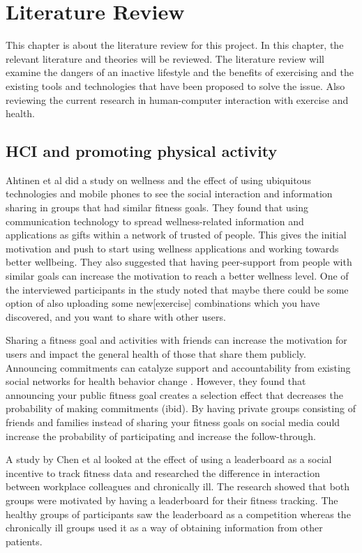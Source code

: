 \chapter{Literature Review}
This chapter is about the literature review for this project. In this chapter, the relevant literature and theories will be reviewed. The literature review will examine the dangers of an inactive lifestyle and the benefits of exercising and the existing tools and technologies that have been proposed to solve the issue. Also reviewing the current research in human-computer interaction with exercise and health.

\section{HCI and promoting physical activity}
Ahtinen et al\cite{Ahtinen2009} did a study on wellness and the effect of using ubiquitous technologies and mobile phones to see the social interaction and information sharing in groups that had similar fitness goals. They found that using communication technology to spread wellness-related information and applications as gifts within a network of trusted of people. This gives the initial motivation and push to start using wellness applications and working towards better wellbeing. They also suggested that having peer-support from people with similar goals can increase the motivation to reach a better wellness level. One of the interviewed participants in the study noted that maybe there could be some option of also uploading some new[exercise] combinations which you have discovered, and you want to share with other users.

Sharing a fitness goal and activities with friends can increase the motivation for users and impact the general health of those that share them publicly. Announcing  commitments can catalyze support and accountability from existing social networks for health behavior change \cite{Munson2015}. However, they found that announcing your public fitness goal creates a selection effect that decreases the probability of making commitments (ibid).  By having private groups consisting of friends and families instead of sharing your fitness goals on social media could increase the probability of participating and increase the follow-through.

A study by Chen et al\cite{Chen2017} looked at the effect of using a leaderboard as a social incentive to track fitness data and researched the difference in interaction between workplace colleagues and chronically ill. The research showed that both groups were motivated by having a leaderboard for their fitness tracking. The healthy groups of participants saw the leaderboard as a competition whereas the chronically ill groups used it as a way of obtaining information from other patients. 

